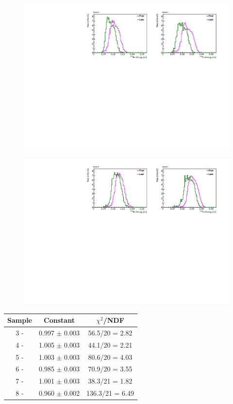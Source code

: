 \begin{figure}[H]
	\centering
	\includegraphics[width=1.\linewidth]{"tex/6-ac227-images/BNL/RnPoEn_FirstAndLast_S8"}
	\caption{}
	\label{fig:rnpoenfirstandlasts8}
\end{figure}

\begin{figure}[h]
	\centering
	\includegraphics[width=1\linewidth]{tex/6-ac227-images/BNL/RnPoEn_FirstAndLast_S6}
	\caption{}
	\label{fig:rnpoenfirstandlasts6}
\end{figure}



\begin{table}[H]
	\centering
\begin{tabular}{|c|c|c|}
	\hline 
	Sample & Constant & $\chi^2$/NDF \\ 
	\hline 
	3 -  & 0.997 $\pm$ 0.003 & 56.5/20 = 2.82 \\ 
	\hline 
	4 - & 1.005 $\pm$ 0.003 & 44.1/20 = 2.21 \\ 
	\hline 
	5 - & 1.003 $\pm$ 0.003 & 80.6/20 = 4.03 \\ 
	\hline 
	6 - & 0.985 $\pm$ 0.003 & 70.9/20 = 3.55 \\ 
	\hline 
	7 - & 1.001 $\pm$ 0.003 & 38.3/21 = 1.82 \\ 
	\hline 
	8 -  & 0.960 $\pm$ 0.002 & 136.3/21 = 6.49 \\ 
	\hline 
\end{tabular} 
\end{table}

